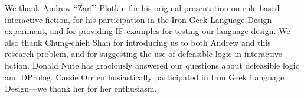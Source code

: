 We thank Andrew ``Zarf'' Plotkin for his original presentation on
rule-based interactive fiction, for his participation in the Iron Geek
Language Design experiment, and for providing IF examples for testing
our language design.
%
We also thank Chung-chieh Shan for introducing us to both Andrew and
this research problem, and for suggesting the use of defeasible logic
in interactive fiction.
%
Donald Nute has graciously answered our questions about defeasible
logic and DProlog.
%
Cassie Orr enthusiastically participated in Iron Geek Language
Design---we thank her for her enthusiasm.
